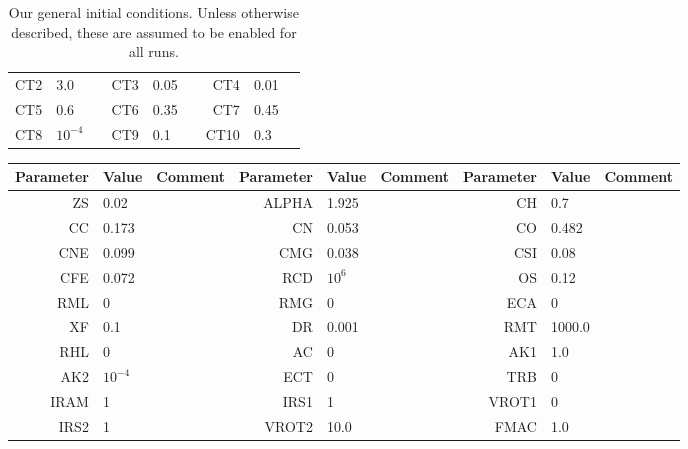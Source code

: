 \begin{table}[!htbp]
\begin{tabular}{rll|rll|rll}
             CT2 & 3.0       &           &         CT3 & 0.05      &           &         CT4 & 0.01      &           \\
             CT5 & 0.6       &           &         CT6 & 0.35      &           &         CT7 & 0.45      &           \\
             CT8 & $10^{-4}$ &           &         CT9 & 0.1       &           &        CT10 & 0.3       &           \\
    \bottomrule
    \end{tabular}
    \label{tab:general_initial_conditions}
    \caption[Our general initial conditions.]{Our general initial conditions. Unless otherwise described, these are assumed to be enabled for all runs.}
\end{table}
\begin{table}
    \centering
    \begin{tabular}{rll|rll|rll}
    \toprule
       Parameter & Value     & Comment   &   Parameter & Value     & Comment   &   Parameter & Value     & Comment   \\
    \midrule
              ZS & 0.02      &           &       ALPHA & 1.925     &           &          CH & 0.7       &           \\
              CC & 0.173     &           &          CN & 0.053     &           &          CO & 0.482     &           \\
             CNE & 0.099     &           &         CMG & 0.038     &           &         CSI & 0.08      &           \\
             CFE & 0.072     &           &         RCD & $10^{6}$  &           &          OS & 0.12      &           \\
             RML & 0         &           &         RMG & 0         &           &         ECA & 0         &           \\
              XF & 0.1       &           &          DR & 0.001     &           &         RMT & 1000.0    &           \\
             RHL & 0         &           &          AC & 0         &           &         AK1 & 1.0       &           \\
             AK2 & $10^{-4}$ &           &         ECT & 0         &           &         TRB & 0         &           \\
            IRAM & 1         &           &        IRS1 & 1         &           &       VROT1 & 0         &           \\
            IRS2 & 1         &           &       VROT2 & 10.0      &           &        FMAC & 1.0       &           \\

\end{tabular}
\end{table}
